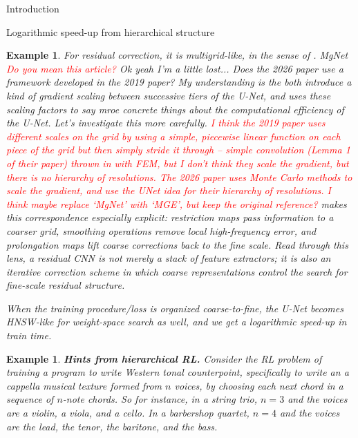 \documentclass[11pt]{article}
\newtheorem{example}[subsubsection]{Example}
\begin{document}
\begin{section}{Introduction}
\begin{subsection}{Logarithmic speed-up from hierarchical structure}
\begin{example}
For residual correction, it is {\em multigrid}-like, in the sense of \cite{AhamedZakariaeiHaberEliasofMGE2026}. MgNet \textcolor{red}{Do you mean this \cite{he2019mgnet} article?} {\color{blue} Ok yeah I'm a little lost... Does the 2026 paper use a framework developed in the 2019 paper? My understanding is the both introduce a kind of gradient scaling between successive tiers of the U-Net, and uses these scaling factors to say mroe concrete things about the computational efficiency of the U-Net. Let's investigate this more carefully.} \textcolor{red}{I think the 2019 paper uses different scales on the grid by using a simple, piecewise linear function on each piece of the grid but then simply stride it through -- simple convolution (Lemma 1 of their paper) thrown in with FEM, but I don't think they scale the gradient, but there is no hierarchy of resolutions. The 2026 paper uses Monte Carlo methods to scale the gradient, and use the UNet idea for their hierarchy of resolutions. I think maybe replace `MgNet' with `MGE', but keep the original reference?} makes this correspondence especially explicit: restriction maps pass information to a coarser grid, smoothing operations remove local high-frequency error, and prolongation maps lift coarse corrections back to the fine scale. Read through this lens, a residual CNN is not merely a stack of feature extractors; it is also an iterative correction scheme in which coarse representations control the search for fine-scale residual structure.

When the training procedure/loss is organized coarse-to-fine, the U-Net becomes HNSW-like for weight-space search as well, and we get a logarithmic speed-up in train time.
\end{example}

\begin{example}
{\bf Hints from hierarchical RL.}
\normalfont
Consider the RL problem of training a program to write Western tonal counterpoint, specifically to write an {\em a cappella} musical texture formed from $n$ voices, by choosing each next chord in a sequence of $n$-note chords. So for instance, in a string trio, $n=3$ and the voices are a violin, a viola, and a cello. In a barbershop quartet, $n=4$ and the voices are the lead, the tenor,  the baritone, and the bass.


\end{example}
\end{subsection}
\end{section}
\end{document}
